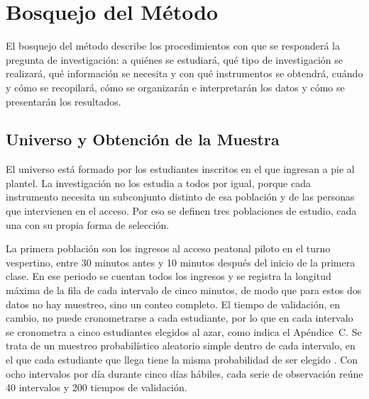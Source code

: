 \section{Bosquejo del Método}
El bosquejo del método describe los procedimientos con que se responderá la
pregunta de investigación: a quiénes se estudiará, qué tipo de investigación
se realizará, qué información se necesita y con qué instrumentos se
obtendrá, cuándo y cómo se recopilará, cómo se organizarán e interpretarán
los datos y cómo se presentarán los resultados.

\subsection{Universo y Obtención de la Muestra}
El universo está formado por los estudiantes inscritos en el \tescha{} que
ingresan a pie al plantel. La investigación no los estudia a todos por igual,
porque cada instrumento necesita un subconjunto distinto de esa población y
de las personas que intervienen en el acceso. Por eso se definen tres
poblaciones de estudio, cada una con su propia forma de selección.

La primera población son los ingresos al acceso peatonal piloto en el turno
vespertino, entre 30 minutos antes y 10 minutos después del inicio de la
primera clase. En ese periodo se cuentan todos los ingresos y se registra la
longitud máxima de la fila de cada intervalo de cinco minutos, de modo que
para estos dos datos no hay muestreo, sino un conteo completo. El tiempo de
validación, en cambio, no puede cronometrarse a cada estudiante, por lo que en
cada intervalo se cronometra a cinco estudiantes elegidos al azar, como indica
el Apéndice~C. Se trata de un muestreo probabilístico aleatorio simple dentro
de cada intervalo, en el que cada estudiante que llega tiene la misma
probabilidad de ser elegido \parencite{hernandezsampieri2014metodologia}. Con ocho intervalos por día durante cinco días hábiles, cada
serie de observación reúne 40 intervalos y 200 tiempos de validación.

